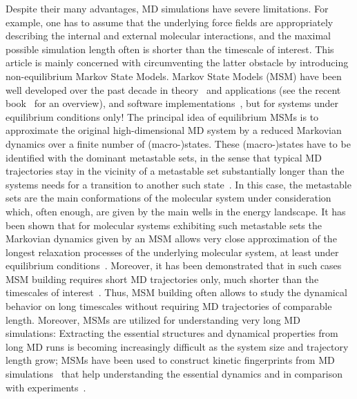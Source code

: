 \documentclass[journal=jctcce,manuscript=article]{achemso}
\begin{document}
Despite their many advantages, MD simulations have severe limitations. For example, one has to assume that the underlying force fields are appropriately describing the internal and external molecular interactions, and the maximal possible simulation length often is shorter than the timescale of interest. 
This article is mainly concerned with circumventing the latter obstacle by introducing non-equilibrium Markov State Models. Markov State Models
(MSM) have been well developed over the
past decade in theory~\cite{A19-31,prinz2011markov} and applications (see the recent book~\cite{A19-1} for an overview), and software implementations~\cite{A19-49, MSMBuilder}, but for systems under equilibrium conditions only!  
The principal idea of equilibrium MSMs is to approximate the original high-dimensional MD system by
a reduced Markovian dynamics over a finite number of (macro-)states. These (macro-)states
have to be identified with the dominant metastable sets, in the sense that
typical MD trajectories stay in the vicinity of a metastable set substantially longer than
the systems needs for a transition to another such state~\cite{A19-31,schuette2011markov}. In this case, the metastable sets are the main conformations of the molecular system under consideration which, often enough, are given by the main wells in the energy landscape. 
It has been shown that for molecular systems exhibiting such metastable sets the Markovian dynamics given by an MSM allows very close approximation of the longest relaxation processes of the underlying molecular system, at least under equilibrium conditions~\cite{sarich2010approximation,Eigenvalues}. 
Moreover, it has been demonstrated that in such cases MSM building requires short MD trajectories only, much shorter than the timescales of interest~\cite{PNAS09,kohlhoff2014cloud}.  
Thus, MSM building often allows to study the dynamical behavior on long timescales without requiring MD trajectories of comparable length.
Moreover, MSMs are utilized for understanding very long MD simulations: Extracting the essential structures and dynamical properties from long MD runs is
becoming increasingly difficult as the system size and trajectory length grow; MSMs have been used to construct kinetic fingerprints from MD simulations~\cite{A19-39} that help understanding the essential dynamics and in comparison with experiments~\cite{PrinzKellerNoe_PCCP11_Perspective}.


\end{document}

